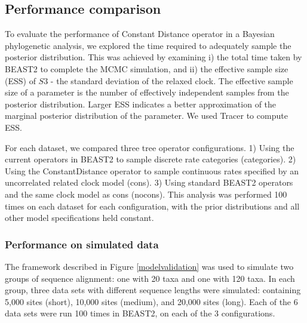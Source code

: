 \documentclass{bmcart}
\begin{document}
\subsection*{Performance comparison}
To evaluate the performance of Constant Distance operator in a Bayesian phylogenetic analysis, we explored the time required to adequately sample the posterior distribution. This was achieved by examining i) the total time taken by BEAST2 to complete the MCMC simulation, and ii) the effective sample size (ESS) of $S3$ - the standard deviation of the relaxed clock. The effective sample size of a parameter is the number of effectively independent samples from the posterior distribution. Larger ESS indicates a better approximation of the marginal posterior distribution of the parameter. We used Tracer \cite{Tracer} to compute ESS.

For each dataset, we compared three tree operator configurations. 1) Using the current operators in BEAST2 to sample discrete rate categories (categories). 2) Using the ConstantDistance operator to sample continuous rates specified by an uncorrelated related clock model (cons). 3) Using standard BEAST2 operators and the same clock model as cons (nocons). This analysis was performed 100 times on each dataset for each configuration, with the prior distributions and all other model specifications held constant.

\subsubsection*{Performance on simulated data}
The framework described in Figure \ref{modelvalidation} was used to simulate two groups of sequence alignment: one with 20 taxa and one with 120 taxa. In each group, three data sets with different sequence lengths were simulated: containing 5,000 sites (short), 10,000 sites (medium), and 20,000 sites (long). Each of the 6 data sets were run 100 times in BEAST2, on each of the 3 configurations.
\end{document}
